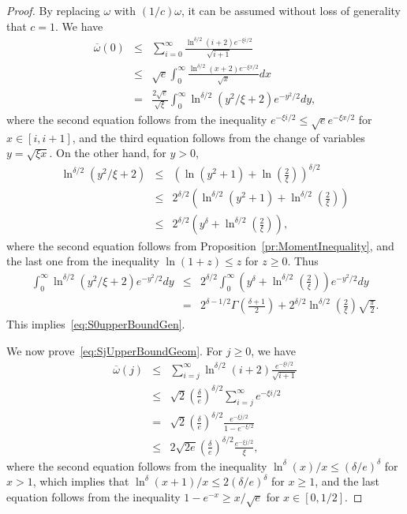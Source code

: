 \documentclass[a4paper,11pt]{article}
\begin{document}
\begin{proof} By replacing \(\omega\) with \((1/c)\omega\), it can be assumed without loss of generality that \(c=1\). We have
\begin{eqnarray*}
\overline{\omega}(0)&\leq&
\sum^{\infty}_{i=0}\frac{\ln^{\delta/2}(i+2)e^{-\xi i/2}}{\sqrt{i+1}}
 \\&\le&\sqrt{e}\int^{\infty}_{0}\frac{\ln^{\delta/2}(x+2)e^{-\xi x/2}}{\sqrt{x}}dx
 \\&=& \frac{2\sqrt{e}}{\sqrt{\xi}}\int^{\infty}_{0}\ln^{\delta/2}(y^{2}/\xi+2)e^{-y^{2}/2}dy, \end{eqnarray*}
where the second equation follows from the inequality \(e^{-\xi i/2}\leq \sqrt{e}e^{-\xi x/2}\) for \(x\in[i,i+1]\), and the third equation follows from the change of variables \(y=\sqrt{\xi x}\).
On the other hand, for \(y>0\), \begin{eqnarray*}\ln^{\delta/2}(y^{2}/\xi+2)
&\le&(\ln(y^{2}+1)+\ln(\frac{2}{\xi}))^{\delta/2}\\&\le&2^{\delta/2}(\ln^{\delta/2}(y^{2}+1)+\ln^{\delta/2}(\frac{2}{\xi}))\\
&\le&2^{\delta/2}(y^{\delta}+\ln^{\delta/2}(\frac{2}{\xi})),
\end{eqnarray*}where the second equation follows from Proposition~\ref{pr:MomentInequality}, and the last one from the inequality \(\ln(1+z)\leq z\) for \(z\geq0\). Thus \begin{eqnarray*}
\int^{\infty}_{0}\ln^{\delta/2}(y^{2}/\xi+2)e^{-y^{2}/2}dy&\le&2^{\delta/2}\int^{\infty}_{0}(y^{\delta}+\ln^{\delta/2}(\frac{2}{\xi}))e^{-y^{2}/2}dy\\&=&2^{\delta-1/2}\Gamma(\frac{\delta+1}{2})+2^{\delta/2}\ln^{\delta/2}(\frac{2}{\xi})\sqrt{\frac{\pi}{2}}.
\end{eqnarray*}This implies~\eqref{eq:S0upperBoundGen}. 

We now prove~\eqref{eq:SjUpperBoundGeom}. 
For \(j\geq 0\), we have
 \begin{eqnarray*}
 \overline{\omega}(j)&\le&
 \sum^{\infty}_{i=j}\ln^{\delta/2}(i+2)\frac{e^{-\xi i/2}}{\sqrt{i+1}}
 \\&\le&\sqrt{2}{\left(\frac{\delta}{e}\right)}^{\delta/2}\sum^{\infty}_{i=j}e^{-\xi i/2}
 \\&=&\sqrt{2}{\left(\frac{\delta}{e}\right)}^{\delta/2}\frac{e^{-\xi j/2}}{1-e^{-\xi/2}}
 \\&\le&2\sqrt{2e}{\left(\frac{\delta}{e}\right)}^{\delta/2}\frac{e^{-\xi j/2}}{\xi}, \end{eqnarray*}
 where the second equation follows from the inequality \(\ln^{\delta}(x)/x\leq(\delta/e)^{\delta}\) for \(x>1\), which implies that  \(\ln^{\delta}(x+1)/x\leq2(\delta/e)^{\delta}\) for \(x\geq1\),  and the last equation follows from the inequality \(1-e^{-x}\geq x/\sqrt{e}\) for \(x\in[0,1/2]\).
 \end{proof}
\end{document}
